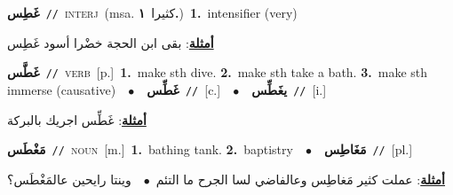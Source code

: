 \documentclass[10pt,a4paper,twoside]{article} %
\begin{document}
\begin{multicols}{2}
{\setlength\topsep{0pt}\textbf{\foreignlanguage{arabic}{غَطِس}}\ {\color{gray}\texttt{//}\color{black}}\ \textsc{interj}\ \color{gray}(msa. \foreignlanguage{arabic}{كثيرا}~\foreignlanguage{arabic}{\textbf{١.}})\color{black}\ \textbf{1.}~intensifier (very)\  \begin{flushright}\color{gray}\foreignlanguage{arabic}{\textbf{\underline{\foreignlanguage{arabic}{أمثلة}}}: بقى ابن الحجة خضْرا أسود غَطِس}\end{flushright}\color{black}} \vspace{2mm}

{\setlength\topsep{0pt}\textbf{\foreignlanguage{arabic}{غَطَّس}}\ {\color{gray}\texttt{//}\color{black}}\ \textsc{verb}\ [p.]\ \textbf{1.}~make sth dive.  \textbf{2.}~make sth take a bath.  \textbf{3.}~make sth immerse (causative)\ \ $\bullet$\ \ \setlength\topsep{0pt}\textbf{\foreignlanguage{arabic}{غَطِّس}}\ {\color{gray}\texttt{//}\color{black}}\ [c.]\ \ $\bullet$\ \ \setlength\topsep{0pt}\textbf{\foreignlanguage{arabic}{يغَطِّس}}\ {\color{gray}\texttt{//}\color{black}}\ [i.]\  \begin{flushright}\color{gray}\foreignlanguage{arabic}{\textbf{\underline{\foreignlanguage{arabic}{أمثلة}}}: غَطِّس اجريك بالبركة}\end{flushright}\color{black}} \vspace{2mm}

{\setlength\topsep{0pt}\textbf{\foreignlanguage{arabic}{مَغْطَس}}\ {\color{gray}\texttt{//}\color{black}}\ \textsc{noun}\ [m.]\ \textbf{1.}~bathing tank.  \textbf{2.}~baptistry\ \ $\bullet$\ \ \setlength\topsep{0pt}\textbf{\foreignlanguage{arabic}{مَغَاطِس}}\ {\color{gray}\texttt{//}\color{black}}\ [pl.]\  \begin{flushright}\color{gray}\foreignlanguage{arabic}{\textbf{\underline{\foreignlanguage{arabic}{أمثلة}}}: عملت كثير مَغاطِس وعالفاضي لسا الجرح ما التئم\ $\bullet$\ \  وينتا رايحين عالمَغْطَس؟}\end{flushright}\color{black}} \vspace{2mm}


\end{multicols}
\end{document}
